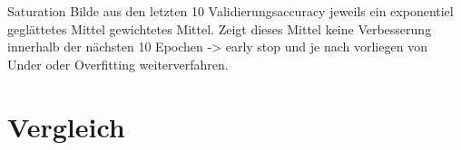 Saturation
Bilde aus den letzten 10 Validierungsaccuracy jeweils ein exponentiel geglättetes Mittel gewichtetes Mittel. Zeigt dieses Mittel keine Verbesserung innerhalb der nächsten 10 Epochen -> early stop und je nach vorliegen von Under oder Overfitting weiterverfahren.



\chapter{Vergleich}\label{sec:vergleich}

